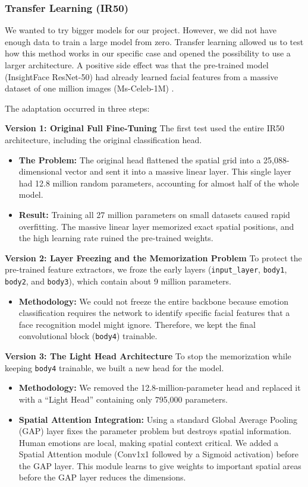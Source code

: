 \subsubsection{Transfer Learning (IR50)}
We wanted to try bigger models for our project. However, we did not have enough data to train a large model from zero. Transfer learning allowed us to test how this method works in our specific case and opened the possibility to use a larger architecture. A positive side effect was that the pre-trained model (InsightFace ResNet-50) had already learned facial features from a massive dataset of one million images (Ms-Celeb-1M) \cite{wang2025qcsfeaturerefiningquadruplet}.

The adaptation occurred in three steps:

\textbf{Version 1: Original Full Fine-Tuning}
The first test used the entire IR50 architecture, including the original classification head.
\begin{itemize}
    \item \textbf{The Problem:} The original head flattened the spatial grid into a 25,088-dimensional vector and sent it into a massive linear layer. This single layer had 12.8 million random parameters, accounting for almost half of the whole model.
    \item \textbf{Result:} Training all 27 million parameters on small datasets caused rapid overfitting. The massive linear layer memorized exact spatial positions, and the high learning rate ruined the pre-trained weights.
\end{itemize}

\textbf{Version 2: Layer Freezing and the Memorization Problem}
To protect the pre-trained feature extractors, we froze the early layers (\texttt{input\_layer}, \texttt{body1}, \texttt{body2}, and \texttt{body3}), which contain about 9 million parameters.
\begin{itemize}
    \item \textbf{Methodology:} We could not freeze the entire backbone because emotion classification requires the network to identify specific facial features that a face recognition model might ignore. Therefore, we kept the final convolutional block (\texttt{body4}) trainable.
\end{itemize}

\textbf{Version 3: The Light Head Architecture}
To stop the memorization while keeping \texttt{body4} trainable, we built a new head for the model.
\begin{itemize}
    \item \textbf{Methodology:} We removed the 12.8-million-parameter head and replaced it with a ``Light Head'' containing only 795,000 parameters.
    \item \textbf{Spatial Attention Integration:} Using a standard Global Average Pooling (GAP) layer fixes the parameter problem but destroys spatial information. Human emotions are local, making spatial context critical. We added a Spatial Attention module (Conv1x1 followed by a Sigmoid activation) before the GAP layer. This module learns to give weights to important spatial areas before the GAP layer reduces the dimensions.
\end{itemize}

